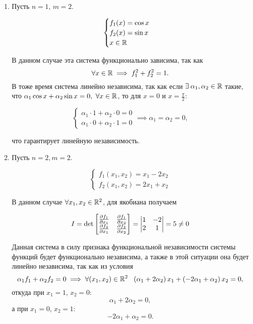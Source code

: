 \documentclass[../../main.tex]{subfiles}
\begin{document}
\begin{examples}

~

	\begin{enumerate}
		\item
		Пусть $n = 1$, $m = 2$.
		
		\[ \begin{cases}
		f_1(x) = \cos x \\
		f_2(x) = \sin x \\
		x \in \mathbb{R}
		\end{cases}  \]
		
		В данном случае эта система функционально зависима, так как 
		\[\forall x \in \mathbb{R} \implies f_1^2 + f_2^2 = 1.\]
		В тоже время система линейно независима, так как если 
		$\exists\:\alpha_1, \alpha_2 \in \mathbb{R} $ такие, что
		$\alpha_1 \cos x + \alpha_2 \sin x = 0,\ \forall x \in 
		\R$, то для $x = 0 \text{ и } x = \frac\pi2$:
		
		\[\begin{cases}
		\alpha_1 \cdot 1 + \alpha_2 \cdot 0 = 0 \\
		\alpha_1 \cdot 0 + \alpha_2 \cdot 1 = 0 
		\end{cases} \implies \alpha_1 = \alpha_2 = 0, \] 
		
		что гарантирует линейную независимость.
		
		\item
		
		Пусть $n = 2, m = 2$.
		
		\[ \begin{cases}
		f_1 \left( x_1, x_2 \right) = x_1 - 2x_2 \\
		f_2 \left( x_1, x_2 \right) = 2x_1 + x_2
		\end{cases} \]
		
		В данном случае $\forall x_1, x_2 \in \mathbb{R}^2$, для якобиана получаем
		
		\[ I = \det \begin{bmatrix}
		\frac{\partial f_1}{\partial x_1} & \frac{\partial f_1}{\partial x_2} \\
		
		\frac{\partial f_2}{\partial x_1} & \frac{\partial f_2}{\partial x_2}
		\end{bmatrix} =
		\begin{vmatrix}
        1 & -2 \\
        2 & 1
		\end{vmatrix} = 5 \ne 0 \]
		
		Данная система в силу признака функциональной 
		независимости системы функций
		будет функционально независима,
		а также в этой ситуации она будет линейно независима, 
		так как из условия \[\alpha_1 f_1 + \alpha_2 f_2 = 0 \implies
		\forall (x_1, x_2) \in \mathbb{R}^2 \ \ \left(\alpha_1 + 
		2\alpha_2\right) x_1 + \left( -2\alpha_1 + \alpha_2 
		\right) x_2 = 0,\]
		откуда при $x_1 = 1$, $x_2 = 0$: \[\alpha_1 + 2\alpha_2 = 0,\]
		а при $x_1 = 0$, $x_2 = 1$: \[-2\alpha_1 + \alpha_2 = 0.\]
		

\end{enumerate}
\end{examples}
\end{document}
